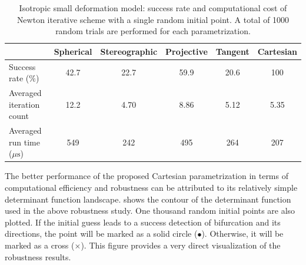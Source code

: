 \documentclass[12pt]{article}
\numberwithin{equation}{section}
\begin{document}
\begin{table}[htbp]
  \begin{center}
    \begin{tabular}{l | c c c c c}
      \toprule
      & Spherical & Stereographic & Projective & Tangent & Cartesian \\
      \midrule
      Success rate ($\%$)      & 42.7 & 22.7 & 59.9  & 20.6  & 100   \\
      Averaged iteration count    & 12.2 & 4.70 & 8.86  & 5.12  & 5.35   \\
      Averaged run time (${\mu\text{s}}$) & 549  & 242  & 495  & 264  & 207 \\
      \bottomrule
    \end{tabular}
    \caption{Isotropic small deformation model: success rate and
      computational cost of Newton iterative scheme with a single
      random initial point. A total of 1000 random trials are
      performed for each parametrization.}
    \label{tab:iso_shear_random_para}
  \end{center}
\end{table}

The better performance of the proposed Cartesian parametrization in
terms of computational efficiency and robustness can be attributed to
its relatively simple determinant function landscape.
 shows the contour of the determinant
function used in the above robustness study. One thousand random
initial points are also plotted. If the initial guess leads to a
success detection of bifurcation and its directions, the point will be
marked as a solid circle ($\bullet$). Otherwise, it will be marked as
a cross ($\times$). This figure provides a very direct visualization
of the robustness results.
\end{document}
